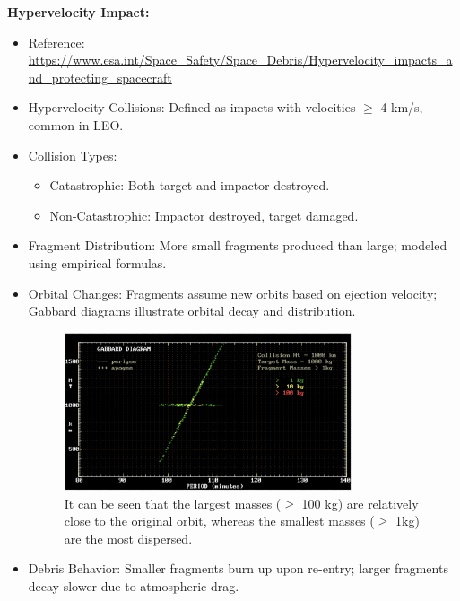 \documentclass[12pt]{report}
\begin{document}
\noindent \textbf{Hypervelocity Impact:}
\begin{itemize}
  \item Reference: \url{https://www.esa.int/Space_Safety/Space_Debris/Hypervelocity_impacts_and_protecting_spacecraft}
  \item Hypervelocity Collisions: Defined as impacts with velocities $ \ge $ 4 km/s, common in LEO.
  \item Collision Types:
  \begin{itemize}
    \item Catastrophic: Both target and impactor destroyed.
    \item Non-Catastrophic: Impactor destroyed, target damaged.
  \end{itemize}
  \item Fragment Distribution: More small fragments produced than large; modeled using empirical formulas.
  \item Orbital Changes: Fragments assume new orbits based on ejection velocity; Gabbard diagrams illustrate orbital decay and distribution.
  
  \begin{figure}[H]
    \centering
    \includegraphics[width=0.8\textwidth]{figure_week_6_gabbard-diagram-au.png}
    \caption{It can be seen that the largest masses ($ \ge $ 100 kg) are relatively close to the original orbit, whereas the smallest masses ($ \ge $ 1kg) are the most dispersed.}
    \label{fig:gabbard-diagram-au}
  \end{figure}

  \item Debris Behavior: Smaller fragments burn up upon re-entry; larger fragments decay slower due to atmospheric drag.
  

\end{itemize}
\end{document}
